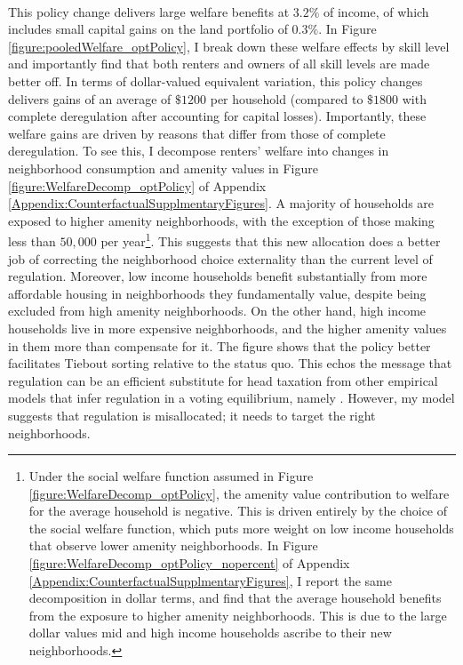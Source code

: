 \documentclass[12pt]{article}
\begin{document}
\paragraph*{}
This policy change delivers large welfare benefits at $3.2\%$ of income, of which includes small capital gains on the land portfolio of $0.3 \%$. In Figure \ref{figure:pooledWelfare_optPolicy}, I break down these welfare effects by skill level and importantly find that both renters and owners of all skill levels are made better off. In terms of dollar-valued equivalent variation, this policy changes delivers gains of an average of $\$1200$ per household (compared to $\$1800$ with complete deregulation after accounting for capital losses). Importantly, these welfare gains are driven by reasons that differ from those of complete deregulation. To see this, I decompose renters' welfare into changes in neighborhood consumption and amenity values in Figure \ref{figure:WelfareDecomp_optPolicy} of Appendix \ref{Appendix:CounterfactualSupplmentaryFigures}. A majority of households are exposed to higher amenity neighborhoods, with the exception of those making less than $50,000$ per year\footnote{Under the social welfare function assumed in Figure \ref{figure:WelfareDecomp_optPolicy}, the amenity value contribution to welfare for the average household is negative. This is driven entirely by the choice of the social welfare function, which puts more weight on low income households that observe lower amenity neighborhoods. In Figure \ref{figure:WelfareDecomp_optPolicy_nopercent} of Appendix \ref{Appendix:CounterfactualSupplmentaryFigures}, I report the same decomposition in dollar terms, and find that the average household benefits from the exposure to higher amenity neighborhoods. This is due to the large dollar values mid and high income households ascribe to their new neighborhoods.}. This suggests that this new allocation does a better job of correcting the neighborhood choice externality than the current level of regulation. Moreover, low income households benefit substantially from more affordable housing in neighborhoods they fundamentally value, despite being excluded from high amenity neighborhoods. On the other hand, high income households live in more expensive neighborhoods, and the higher amenity values in them more than compensate for it. The figure shows that the policy better facilitates Tiebout sorting relative to the status quo. This echos the message that regulation can be an efficient substitute for head taxation from other empirical models that infer regulation in a voting equilibrium, namely \cite{calabresetal}. However, my model suggests that regulation is misallocated; it needs to target the right neighborhoods.
\end{document}
